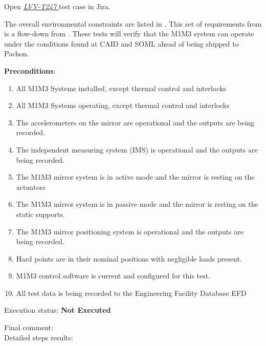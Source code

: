\documentclass[SE,lsstdraft,STR,toc]{lsstdoc}
\providecommand{\tightlist}{
  \setlength{\itemsep}{0pt}\setlength{\parskip}{0pt}}
\begin{document}
Open  \href{https://jira.lsstcorp.org/secure/Tests.jspa#/testCase/LVV-T247}{\textit{ LVV-T247 } }
test case in Jira.

The overall environmental constraints are listed in . This set of
requirements from  is a flow-down from . These tests will
verify that the M1M3 system can operate under the conditions found at
CAID and SOML ahead of being shipped to Pachon.

\textbf{ Preconditions}:\\
\begin{enumerate}
\tightlist
\item
  All M1M3 Systems installed, except thermal control and interlocks
\item
  All M1M3 Systems operating, except thermal control and interlocks
\item
  The accelerometers on the mirror are operational and the outputs are
  being recorded.
\item
  The independent measuring system (IMS) is operational and the outputs
  are being recorded.
\item
  The M1M3 mirror system is in active mode and the mirror is resting on
  the actuators
\item
  The M1M3 mirror system is in passive mode and the mirror is resting on
  the static supports.
\item
  The M1M3 mirror positioning system is operational and the outputs are
  being recorded.
\item
  Hard points are in their nominal positions with negligible loads
  present.
\item
  M1M3 control software is current and configured for this test.
\item
  All test data is being recorded to the Engineering Facility Database
  EFD
\end{enumerate}

Execution status: {\bf Not Executed }

Final comment:\\


Detailed steps results:
\end{document}
